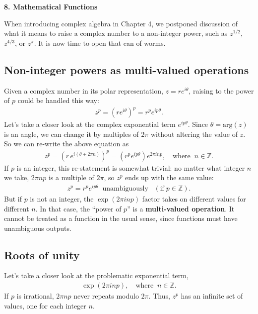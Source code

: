 \documentclass[10pt,a4paper]{article}
\begin{document}
\setcounter{page}{54}

\noindent
{\Large \textbf{8. Mathematical Functions}}
\vskip 0.2in

\label{branch-points-and-branch-cuts}

When introducing complex algebra in Chapter 4, we postponed discussion
of what it means to raise a complex number to a non-integer power,
such as $z^{1/2}$, $z^{4/3}$, or $z^{\pi}$. It is now time to open
that can of worms.

\subsection{Non-integer powers as multi-valued operations}
\label{non-integer-powers-as-multi-valued-operations}

Given a complex number in its polar representation, $z = r
e^{i\theta}$, raising to the power of $p$ could be handled this way:
\begin{align}
  z^p = \left(re^{i\theta}\right)^p = r^p e^{ip\theta}.
\end{align}
Let's take a closer look at the complex exponential term
$e^{ip\theta}$.  Since $\theta = \mathrm{arg}(z)$ is an angle, we can
change it by multiples of $2\pi$ without altering the value of $z$.
So we can re-write the above equation as
\begin{align}
  z^p = \left(r\,e^{i(\theta + 2\pi n)}\right)^p = \left(r^p e^{ip\theta} \right) e^{2\pi i n p}, \quad \mathrm{where}\;\; n\in\mathbb{Z}.
\end{align}
If $p$ is an integer, this re-statement is somewhat trivial: no matter
what integer $n$ we take, $2\pi n p$ is a multiple of $2\pi$, so $z^p$
ends up with the same value:
\begin{align}
  z^p = r^p e^{ip\theta} \;\;\textrm{unambiguously} \;\;\;(\text{if}\;p\in\mathbb{Z}).
\end{align}
But if $p$ is not an integer, the $\exp\left(2 \pi i np\right)$ factor
takes on different values for different $n$. In that case, the ``power
of $p$'' is a \textbf{multi-valued operation}. It cannot be treated as
a function in the usual sense, since functions must have unambiguous
outputs.

\subsection{Roots of unity}\label{roots-of-unity}

Let's take a closer look at the problematic exponential term,
\begin{align}
  \exp\left(2\pi i np\right), \quad\mathrm{where}\;\; n \in \mathbb{Z}.
\end{align}
If $p$ is irrational, $2\pi np$ never repeats modulo $2\pi$. Thus,
$z^p$ has an infinite set of values, one for each integer $n$.
\end{document}
